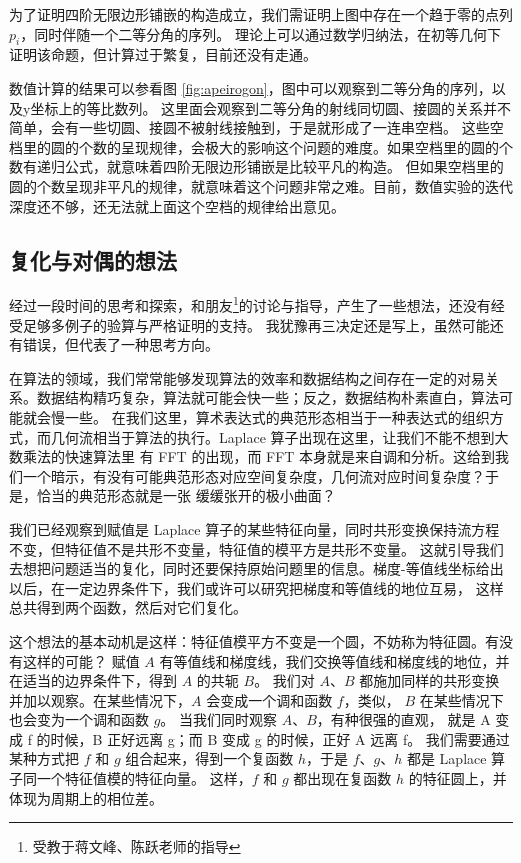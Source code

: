 \documentclass[a4paper,12pt]{article}
\numberwithin{problem}{section}
\numberwithin{definition}{section}
\numberwithin{lemma}{section}
\numberwithin{proposition}{section}
\numberwithin{theorem}{section}
\numberwithin{grammar}{section}
\numberwithin{program}{section}
\numberwithin{convention}{section}
\numberwithin{corollary}{section}
\begin{document}
为了证明四阶无限边形铺嵌的构造成立，我们需证明上图中存在一个趋于零的点列$p_i$，同时伴随一个二等分角的序列。
理论上可以通过数学归纳法，在初等几何下证明该命题，但计算过于繁复，目前还没有走通。

数值计算的结果可以参看图 \ref{fig:apeirogon}，图中可以观察到二等分角的序列，以及y坐标上的等比数列。
这里面会观察到二等分角的射线同切圆、接圆的关系并不简单，会有一些切圆、接圆不被射线接触到，于是就形成了一连串空档。
这些空档里的圆的个数的呈现规律，会极大的影响这个问题的难度。如果空档里的圆的个数有递归公式，就意味着四阶无限边形铺嵌是比较平凡的构造。
但如果空档里的圆的个数呈现非平凡的规律，就意味着这个问题非常之难。目前，数值实验的迭代深度还不够，还无法就上面这个空档的规律给出意见。

\subsection{复化与对偶的想法}

经过一段时间的思考和探索，和朋友\footnote{受教于蒋文峰、陈跃老师的指导}的讨论与指导，产生了一些想法，还没有经受足够多例子的验算与严格证明的支持。
我犹豫再三决定还是写上，虽然可能还有错误，但代表了一种思考方向。

在算法的领域，我们常常能够发现算法的效率和数据结构之间存在一定的对易关系。数据结构精巧复杂，算法就可能会快一些；反之，数据结构朴素直白，算法可能就会慢一些。
在我们这里，算术表达式的典范形态相当于一种表达式的组织方式，而几何流相当于算法的执行。Laplace 算子出现在这里，让我们不能不想到大数乘法的快速算法里
有 FFT 的出现，而 FFT 本身就是来自调和分析。这给到我们一个暗示，有没有可能典范形态对应空间复杂度，几何流对应时间复杂度？于是，恰当的典范形态就是一张
缓缓张开的极小曲面？

我们已经观察到赋值是 Laplace 算子的某些特征向量，同时共形变换保持流方程不变，但特征值不是共形不变量，特征值的模平方是共形不变量。
这就引导我们去想把问题适当的复化，同时还要保持原始问题里的信息。梯度-等值线坐标给出以后，在一定边界条件下，我们或许可以研究把梯度和等值线的地位互易，
这样总共得到两个函数，然后对它们复化。

这个想法的基本动机是这样：特征值模平方不变是一个圆，不妨称为特征圆。有没有这样的可能？
赋值 $A$ 有等值线和梯度线，我们交换等值线和梯度线的地位，并在适当的边界条件下，得到 $A$ 的共轭 $B$。
我们对 $A$、$B$ 都施加同样的共形变换并加以观察。在某些情况下，$A$ 会变成一个调和函数 $f$，类似， $B$ 在某些情况下也会变为一个调和函数 $g$。
当我们同时观察 $A$、$B$，有种很强的直观， 就是 A 变成 f 的时候，B 正好远离 g；而 B 变成 g 的时候，正好 A 远离 f。
我们需要通过某种方式把 $f$ 和 $g$ 组合起来，得到一个复函数 $h$，于是 $f$、$g$、$h$ 都是 Laplace 算子同一个特征值模的特征向量。
这样，$f$ 和 $g$ 都出现在复函数 $h$ 的特征圆上，并体现为周期上的相位差。
\end{document}

